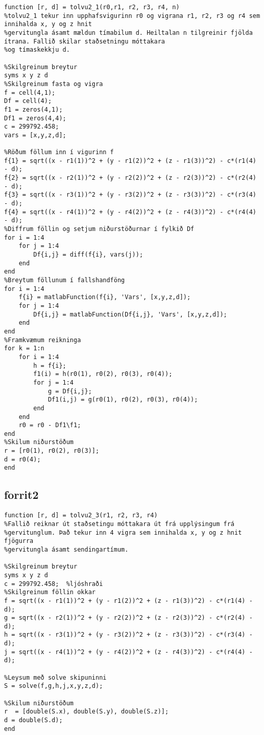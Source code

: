 \documentclass[11pt]{article}
\begin{document}
\begin{verbatim}
function [r, d] = tolvu2_1(r0,r1, r2, r3, r4, n)
%tolvu2_1 tekur inn upphafsvigurinn r0 og vigrana r1, r2, r3 og r4 sem innihalda x, y og z hnit
%gervitungla ásamt mældun tímabilum d. Heiltalan n tilgreinir fjölda ítrana. Fallið skilar staðsetningu móttakara
%og tímaskekkju d.

%Skilgreinum breytur
syms x y z d
%Skilgreinum fasta og vigra
f = cell(4,1);
Df = cell(4);
f1 = zeros(4,1);
Df1 = zeros(4,4);
c = 299792.458;
vars = [x,y,z,d];

%Röðum föllum inn í vigurinn f
f{1} = sqrt((x - r1(1))^2 + (y - r1(2))^2 + (z - r1(3))^2) - c*(r1(4) - d);
f{2} = sqrt((x - r2(1))^2 + (y - r2(2))^2 + (z - r2(3))^2) - c*(r2(4) - d);
f{3} = sqrt((x - r3(1))^2 + (y - r3(2))^2 + (z - r3(3))^2) - c*(r3(4) - d);
f{4} = sqrt((x - r4(1))^2 + (y - r4(2))^2 + (z - r4(3))^2) - c*(r4(4) - d);
%Diffrum föllin og setjum niðurstöðurnar í fylkið Df
for i = 1:4
    for j = 1:4
        Df{i,j} = diff(f{i}, vars(j));
    end
end
%Breytum föllunum í fallshandföng
for i = 1:4
    f{i} = matlabFunction(f{i}, 'Vars', [x,y,z,d]);
    for j = 1:4
        Df{i,j} = matlabFunction(Df{i,j}, 'Vars', [x,y,z,d]);
    end
end
%Framkvæmum reikninga
for k = 1:n
    for i = 1:4
        h = f{i};
        f1(i) = h(r0(1), r0(2), r0(3), r0(4));
        for j = 1:4
            g = Df{i,j};
            Df1(i,j) = g(r0(1), r0(2), r0(3), r0(4));
        end
    end
    r0 = r0 - Df1\f1;
end
%Skilum niðurstöðum
r = [r0(1), r0(2), r0(3)];
d = r0(4);
end
\end{verbatim}

\subsection*{forrit2}

\begin{verbatim}
function [r, d] = tolvu2_3(r1, r2, r3, r4)
%Fallið reiknar út staðsetingu móttakara út frá upplýsingum frá
%gervitunglum. Það tekur inn 4 vigra sem innihalda x, y og z hnit fjögurra
%gervitungla ásamt sendingartímum.

%Skilgreinum breytur
syms x y z d
c = 299792.458;  %ljóshraði
%Skilgreinum föllin okkar
f = sqrt((x - r1(1))^2 + (y - r1(2))^2 + (z - r1(3))^2) - c*(r1(4) - d);
g = sqrt((x - r2(1))^2 + (y - r2(2))^2 + (z - r2(3))^2) - c*(r2(4) - d);
h = sqrt((x - r3(1))^2 + (y - r3(2))^2 + (z - r3(3))^2) - c*(r3(4) - d);
j = sqrt((x - r4(1))^2 + (y - r4(2))^2 + (z - r4(3))^2) - c*(r4(4) - d);

%Leysum með solve skipuninni
S = solve(f,g,h,j,x,y,z,d);

%Skilum niðurstöðum
r  = [double(S.x), double(S.y), double(S.z)];
d = double(S.d);
end
\end{verbatim}
\end{document}
